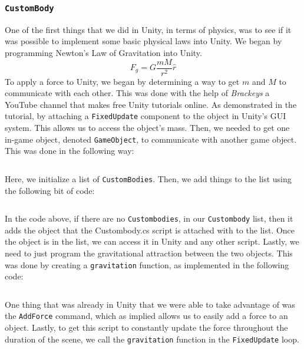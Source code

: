 \documentclass[12pt]{article}
\begin{document}
\subsubsection{\texttt{CustomBody}}
One of the first things that we did in Unity, in terms of physics, was to see if it was possible to implement some basic physical laws into Unity. We began by programming Newton's Law of Gravitation into Unity. 
\begin{equation}
	F_g = G\frac{m M}{r^2}\hat{r}
\end{equation}
To apply a force to Unity, we began by determining a way to get $m$ and $M$ to communicate with each other. This was done with the help of \textit{Brackeys} a YouTube channel that makes free Unity tutorials online. As demonstrated in the tutorial, by attaching a \texttt{FixedUpdate} component to the object in Unity's GUI system. This allows us to access the object's mass. Then, we needed to get one in-game object, denoted \texttt{GameObject}, to communicate with another game object. This was done in the following way:
\inputminted[firstline=7,lastline=8,linenos,fontsize=\footnotesize,bgcolor=codebg]{csharp}{../unity/Assets/Scripts/Engine/CustomBody.cs}
Here, we initialize a list of \texttt{CustomBodies}. Then, we add things to the list using the following bit of code:
\inputminted[firstline=26,lastline=36,linenos,fontsize=\footnotesize,bgcolor=codebg]{csharp}{../unity/Assets/Scripts/Engine/CustomBody.cs}
In the code above, if there are no \texttt{Custombodies}, in our \texttt{Custombody} list, then it adds the object that the Custombody.cs script is attached with to the list. Once the object is in the list, we can access it in Unity and any other script. Lastly, we need to just program the gravitational attraction between the two objects. This was done by creating a \texttt{gravitation} function, as implemented in the following code:
\inputminted[firstline=39,lastline=70,linenos,fontsize=\footnotesize,bgcolor=codebg]{csharp}{../unity/Assets/Scripts/Engine/CustomBody.cs}
One thing that was already in Unity that we were able to take advantage of was the \texttt{AddForce} command, which as implied allows us to easily add a force to an object. Lastly, to get this script to constantly update the force throughout the duration of the scene, we call the \texttt{gravitation} function in the \texttt{FixedUpdate} loop.
\end{document}
